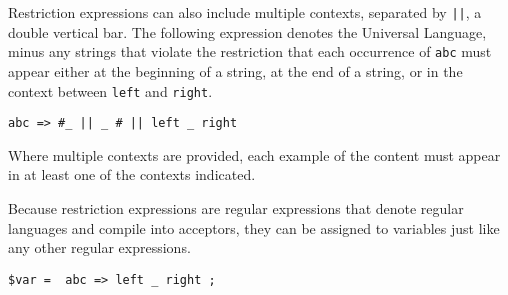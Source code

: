 Restriction expressions can also include multiple contexts, separated by
\texttt{||}, a double vertical bar.  The following expression denotes the
Universal Language, minus any strings that violate the restriction that
each occurrence of \texttt{abc} must appear either at the beginning of a
string, at the end of a string, or in the context between \texttt{left}
and \texttt{right}.

\begin{Verbatim}
abc => #_ || _ # || left _ right 
\end{Verbatim}

\noindent
Where multiple contexts are provided, each example of the content
must appear in at least one of the contexts indicated.

Because restriction expressions are regular expressions that denote
regular languages and compile into acceptors, they can be assigned to
variables just like any other regular expressions.

\begin{Verbatim}
$var =  abc => left _ right ;
\end{Verbatim}


